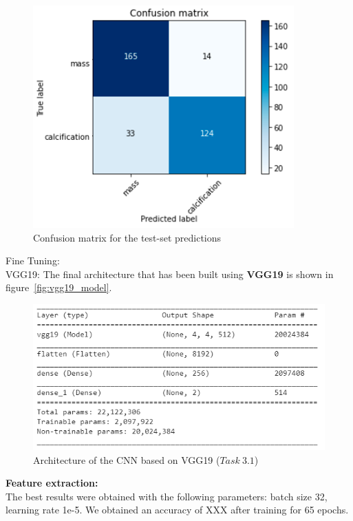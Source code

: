 \documentclass[11pt,a4paper,oneside]{article}
\begin{document}
\begin{figure}[h]
\begin{minipage}[c]{.4\textwidth}
		\includegraphics[width=.9\textwidth]{images/Task 3/VGG16 3.1/Conf Matrix}
		\caption{Confusion matrix for the test-set predictions}
		\label{fig:vgg16_3.1_matrix}
	\end{minipage}%
\end{figure}

Fine Tuning:\\


VGG19: 
The final architecture that has been built using \textbf{VGG19} is shown in figure~\ref{fig:vgg19_model}. 

\begin{figure}[h]
\centering
\includegraphics[width=.5\textwidth]{images/Task 3/VGG19 3.1/Model}
\caption{Architecture of the CNN based on VGG19 ($Task\ 3.1$)}
\label{fig:vgg16_model}
\end{figure}

\textbf{Feature extraction:}\\
The best results were obtained with the following parameters: batch size 32, learning rate 1e-5. We obtained an accuracy of XXX after training for 65 epochs.
\end{document}
